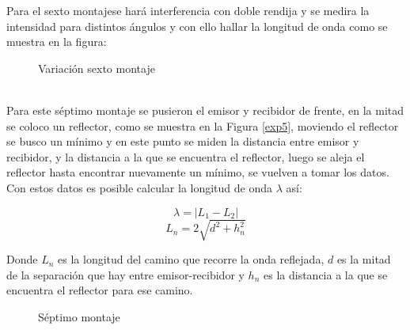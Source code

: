 \documentclass[aps,prl,reprint]{revtex4-1}
\begin{document}
Para el sexto montajese hará interferencia con doble rendija y se medira la intensidad para distintos ángulos y con ello hallar la longitud de onda como se muestra en la figura: \begin{figure}[H]
\begin{center}
 \caption{Variaci\'on sexto montaje}
 \label{exp6}
 \end{center}
\end{figure}
\\

Para este séptimo montaje se pusieron el emisor y recibidor de frente, en la mitad se coloco un reflector, como se muestra en la Figura \ref{exp5}, moviendo el reflector se busco un mínimo y en este punto se miden la distancia entre emisor y recibidor, y la distancia a la que se encuentra el reflector, luego se aleja el reflector hasta encontrar nuevamente un mínimo, se vuelven a tomar los datos. Con estos datos es posible calcular la longitud de onda $\lambda$ así:

\begin{equation*}
    \lambda=|L_{1}-L_{2}|
\end{equation*}
\begin{equation*}
    L_{n}=2\sqrt{d^{2}+h_{n}^{2}}
\end{equation*}

Donde $L_{n}$ es la longitud del camino que recorre la onda reflejada, $d$ es la mitad de la separación que hay entre emisor-recibidor y $h_{n}$ es la distancia a la que se encuentra el reflector para ese camino.


\begin{figure}[H]
\begin{center}
 \caption{S\'eptimo montaje}
 \label{exp7}
 \end{center}
\end{figure}
\end{document}
